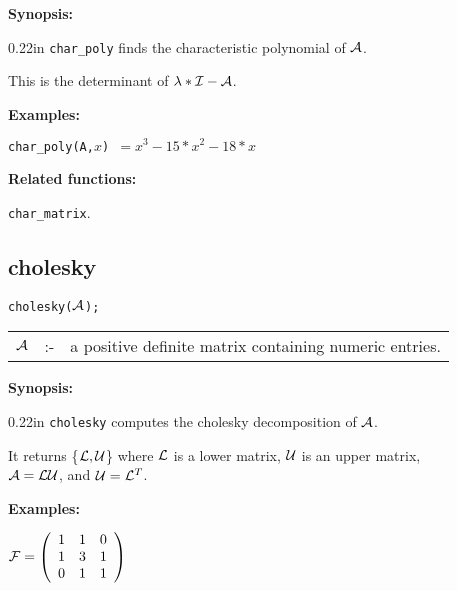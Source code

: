 {\bf Synopsis:} %

\begin{addtolength}{\leftskip}{0.22in}
{\tt char\_poly} finds the characteristic polynomial of
                ${\cal A}$.  

This is the determinant of $\lambda * {\cal I} - {\cal A}$.

\end{addtolength}

{\bf Examples:}

\hspace*{0.175in}
{\tt char\_poly({\cal A},$x$) $= x^3-15*x^2-18*x$} 

{\bf Related functions:}

\hspace*{0.175in} {\tt char\_matrix}. 


\subsection{cholesky}


\hspace*{0.175in} {\tt cholesky(${\cal A}$);}

\hspace*{0.1in} 
\begin{tabular}{l l l}
${\cal A}$ &:-& a positive definite matrix containing numeric entries.
\end{tabular}

{\bf Synopsis:} %

\begin{addtolength}{\leftskip}{0.22in}
{\tt cholesky} computes the cholesky decomposition of ${\cal A}$.

It returns \{${\cal L,U}$\} where ${\cal L}$
is a lower matrix, ${\cal U}$ is an upper matrix, \\ ${\cal A} = 
{\cal LU}$, and ${\cal U} = {\cal L}^T$.

\end{addtolength}

{\bf Examples:}

\begin{flushleft}  
\hspace*{0.175in}
\begin{math}  
{\cal F} = \left( \begin{array}{ccc} 1 & 1 & 0 \\ 1 & 3 & 1 \\ 0 & 1 & 
1
\end{array} \right)
\end{math}  
\end{flushleft}

